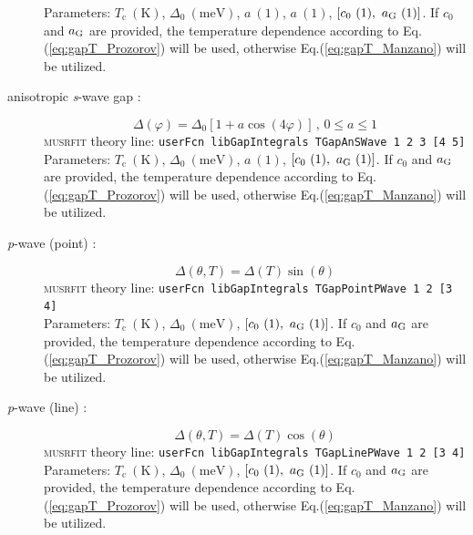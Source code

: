 \documentclass[twoside]{article}
\newcommand{\musrfit}{\textsc{musrfit}\xspace}
\begin{document}
\begin{description}
    Parameters: $T_{\mathrm c}~(\mathrm{K})$, $\Delta_0~(\mathrm{meV})$, $a~(1)$, $a~(1)$, $[c_0~(1),~a_{\rm G}~(1)]$. 
    If $c_0$ and $a_{\rm G}$ are provided, the temperature dependence according to Eq.(\ref{eq:gapT_Prozorov}) will be used, 
    otherwise Eq.(\ref{eq:gapT_Manzano}) will be utilized.
 \item[anisotropic \textit{s}-wave gap \cite{AnisotropicSWave}:] 
    \begin{equation}
      \Delta(\varphi) = \Delta_0\left[1+a\cos\left(4\varphi\right)\right]\,,\,0\leqslant a\leqslant1
    \end{equation}
    \musrfit theory line: \verb?userFcn libGapIntegrals TGapAnSWave 1 2 3 [4 5]?\\[1.5ex]
    Parameters: $T_{\mathrm c}~(\mathrm{K})$, $\Delta_0~(\mathrm{meV})$, $a~(1)$, $[c_0~(1),~a_{\rm G}~(1)]$. 
    If $c_0$ and $a_{\rm G}$ are provided, the temperature dependence according to Eq.(\ref{eq:gapT_Prozorov}) will be used, 
    otherwise Eq.(\ref{eq:gapT_Manzano}) will be utilized.
\item[\textit{p}-wave (point) \cite{Pang2015}:]
   \begin{equation}
     \Delta(\theta, T) = \Delta(T) \sin(\theta)
   \end{equation}
   \musrfit theory line: \verb?userFcn libGapIntegrals TGapPointPWave 1 2 [3 4]?\\[1.5ex]
    Parameters: $T_{\mathrm c}~(\mathrm{K})$, $\Delta_0~(\mathrm{meV})$, $[c_0~(1),~a_{\rm G}~(1)]$. If $c_0$ and $a_{\rm G}$ are provided, 
    the temperature dependence according to Eq.(\ref{eq:gapT_Prozorov}) will be used, otherwise Eq.(\ref{eq:gapT_Manzano}) will be utilized.
\item[\textit{p}-wave (line) \cite{Ozaki1986}:]
   \begin{equation}
     \Delta(\theta, T) = \Delta(T) \cos(\theta)
   \end{equation}
   \musrfit theory line: \verb?userFcn libGapIntegrals TGapLinePWave 1 2 [3 4]?\\[1.5ex]
    Parameters: $T_{\mathrm c}~(\mathrm{K})$, $\Delta_0~(\mathrm{meV})$, $[c_0~(1),~a_{\rm G}~(1)]$. If $c_0$ and $a_{\rm G}$ are provided, 
    the temperature dependence according to Eq.(\ref{eq:gapT_Prozorov}) will be used, otherwise Eq.(\ref{eq:gapT_Manzano}) will be utilized.
\end{description}
\end{document}
